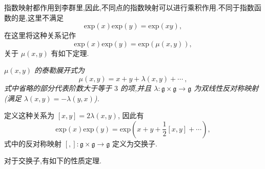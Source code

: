 指数映射都作用到李群里,因此,不同点的指数映射可以进行乘积作用.不同于指数函数的是,这里不满足
\begin{equation*}
	\mathrm{exp}(x)\mathrm{exp}(y)=\mathrm{exp}(xy),
\end{equation*}
在这里将这种关系记作
\begin{equation*}
	\mathrm{exp}(x)\mathrm{exp}(y)=\mathrm{exp}(\mu(x,y)),
\end{equation*}
关于 $\mu(x,y)$ 有如下定理.

\begin{theorem}
	\emph{$\mu(x,y)$ 的泰勒展开式为
	\begin{equation*}
		\mu(x,y)=x + y + \lambda(x, y) +\cdots ~,
	\end{equation*}
	式中省略的部分代表阶数大于等于 $3$ 的项,并且 $\lambda:\mathfrak{g}\times\mathfrak{g}\to \mathfrak{g}$ 为双线性反对称映射(满足 $\lambda(x, y) = −\lambda(y, x)$).}
\end{theorem}

定义这种关系为 $[x,y]=2\lambda(x,y)$, 因此有
\begin{equation*}
	\mathrm{exp}(x)\mathrm{exp}(y)=\mathrm{exp}(x+y+\frac{1}{2}[x,y]+\cdots),
\end{equation*}
式中的反对称映射 $[,]:\mathfrak{g}\times\mathfrak{g}\to \mathfrak{g}$ 定义为交换子.

对于交换子,有如下的性质定理.


